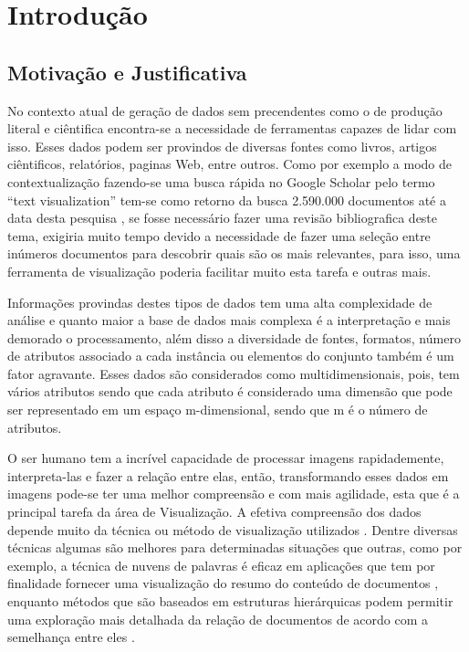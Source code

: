 
\chapter{Introdução}
\label{cap-introducao}

\section{Motivação e Justificativa}

No contexto atual de geração de dados sem precendentes como o de produção literal e ciêntifica encontra-se a necessidade de ferramentas capazes de lidar com isso. Esses dados podem ser provindos de diversas fontes como livros, artigos ciêntificos, relatórios, paginas Web, entre outros. Como por exemplo a modo de contextualização fazendo-se uma busca rápida no Google Scholar pelo termo ``text visualization'' tem-se como retorno da busca 2.590.000 documentos até a data desta pesquisa \cite{IEEEsearch} , se fosse necessário fazer uma revisão bibliografica deste tema, exigiria muito tempo devido a necessidade de fazer uma seleção entre inúmeros documentos para descobrir quais são os mais relevantes, para isso, uma ferramenta de visualização poderia facilitar muito esta tarefa  e outras mais. 

Informações provindas destes tipos de dados tem uma alta complexidade de análise e quanto maior a base de dados mais complexa é a interpretação e mais demorado o processamento, além disso a diversidade de fontes, formatos, número de atributos associado a cada instância ou elementos do conjunto também é um fator agravante. Esses dados são considerados como multidimensionais, pois, tem vários atributos sendo que cada atributo é considerado uma dimensão que pode ser representado em um espaço m-dimensional, sendo que m é o número de atributos.

O ser humano tem a incrível capacidade de processar imagens rapidademente, interpreta-las e fazer a relação entre elas, então, transformando esses dados em imagens pode-se ter uma melhor compreensão e com mais agilidade, esta que é a principal tarefa  da área de Visualização. A efetiva compreensão dos dados depende muito da técnica ou método de visualização utilizados \cite{pagliosa2013mist}. Dentre diversas técnicas algumas são melhores para determinadas situações que outras, como por exemplo, a técnica de nuvens de palavras é eficaz em aplicações que tem por finalidade fornecer uma visualização do resumo do conteúdo de documentos \cite{pagliosa2013mist}, enquanto métodos que são baseados em estruturas hierárquicas podem permitir uma exploração mais detalhada da relação de documentos de acordo com a semelhança entre eles \cite{ward2015interactive}.


